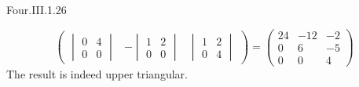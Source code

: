 \begin{ans}{Four.III.1.26}
\begin{exparts}
\begin{equation*}
\begin{pmatrix}
\begin{vmatrix}
                0  &4  \\  0  &0
              \end{vmatrix}
              &-\begin{vmatrix}
                1  &2  \\  0  &0
              \end{vmatrix}
              &\begin{vmatrix}
                1  &2  \\  0  &4
              \end{vmatrix}
            \end{pmatrix}
            =
            \begin{pmatrix}
              24  &-12 &-2 \\
               0  &6   &-5  \\
               0  &0   &4
            \end{pmatrix}
          \end{equation*}
          The result is indeed upper triangular.


\end{exparts}
\end{ans}
